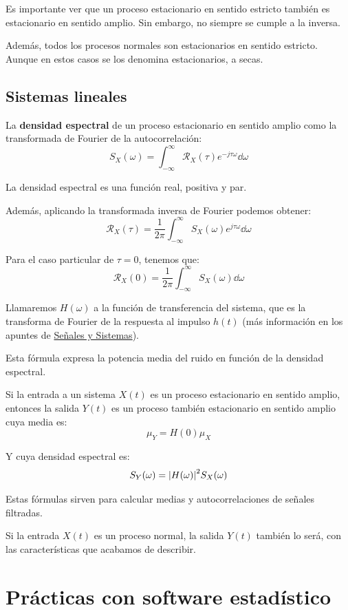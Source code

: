 \documentclass[a4paper]{book}
\begin{document}
Es importante ver que un proceso estacionario en sentido estricto también es estacionario en sentido amplio. Sin embargo, no siempre se cumple a la inversa.

Además, todos los procesos normales son estacionarios en sentido estricto. Aunque en estos casos se los denomina estacionarios, a secas.

\section{Sistemas lineales}

La \textbf{densidad espectral} de un proceso estacionario en sentido amplio como la transformada de Fourier de la autocorrelación:
\[ S_X(\omega ) = \int_{-\infty}^{\infty} \mathcal{R}_X (\tau )e^{-j\tau \omega }\dd{\omega} \]

La densidad espectral es una función real, positiva y par.

Además, aplicando la transformada inversa de Fourier podemos obtener:
\[ \mathcal{R}_X(\tau )=\frac{1}{2\pi}\int_{-\infty}^{\infty}S_X(\omega )e^{j\tau \omega} \dd{\omega}\]

Para el caso particular de $\tau = 0$, tenemos que:
\[ \mathcal{R}_X(0)=\frac{1}{2\pi}\int_{-\infty}^{\infty}S_X(\omega )\dd{\omega}\]

Llamaremos $H(\omega )$ a la función de transferencia del sistema, que es la transforma de Fourier de la respuesta al impulso $h(t)$ (más información en los apuntes de \href{\detokenize{https://github.com/Javiolonchelo/ApuntesTeleco_2/blob/main/Primer%20Semestre/Señales%20y%20Sistemas/Señales_y_Sistemas.pdf}}{Señales y Sistemas}).

Esta fórmula expresa la potencia media del ruido en función de la densidad espectral.

Si la entrada a un sistema $X(t)$ es un proceso estacionario en sentido amplio, entonces la salida $Y(t)$ es un proceso también estacionario en sentido amplio cuya media es:
\[ \mu _Y = H(0)\mu _X \]

Y cuya densidad espectral es:
\[ S_Y(\omega )= \abs{H(\omega )}^2 S_X(\omega )  \]

Estas fórmulas sirven para calcular medias y autocorrelaciones de señales filtradas.

Si la entrada $X(t)$ es un proceso normal, la salida $Y(t)$ también lo será, con las características que acabamos de describir.

\chapter{Prácticas con software estadístico}
\end{document}
